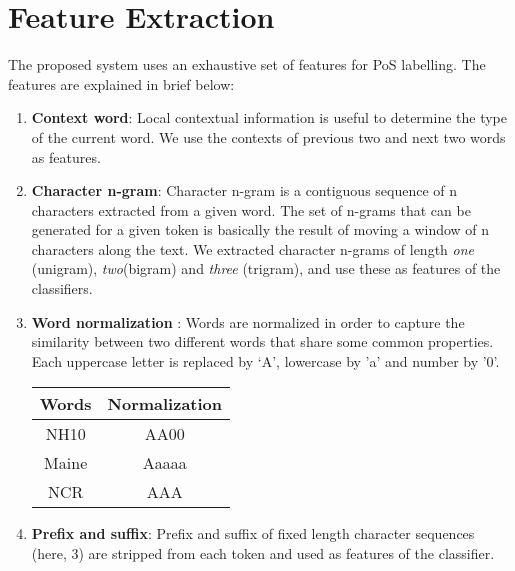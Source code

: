 \documentclass[11pt,a4paper]{article}
\begin{document}
\section{Feature Extraction}\label{feature}
The proposed system uses an exhaustive set of features for PoS labelling. The features are explained in brief below:
\begin{enumerate}
\item \textbf{Context word}: Local contextual information is useful to determine the type of the current word. We use the contexts of previous two and next two words as features. 
\item \textbf{Character n-gram}: 
Character n-gram is a contiguous sequence of n characters extracted from a given word. The set of n-grams that can be generated for a given token is basically the result of moving a window of n characters along the text. We extracted character n-grams of length \textit{one} (unigram), \textit{two}(bigram) and \textit{three} (trigram), and use these as features of the classifiers.
\item \textbf{Word normalization }: Words are normalized in order to capture the similarity between two different words that share some common properties. Each uppercase letter is replaced by \lq A\rq, lowercase by 'a' and number by '0'.
\begin{table}[h]
\centering
\begin{tabular}{|c|c|}
\hline
\textbf{Words} & \textbf{Normalization} \\ \hline
NH10  & AA00          \\ \hline
Maine & Aaaaa         \\ \hline
NCR   & AAA           \\ \hline
\end{tabular}
\end{table}
\item \textbf{Prefix and suffix}: Prefix and suffix of fixed length character sequences (here, 3) are stripped from each token and used as features of the classifier. 


\end{enumerate}
\end{document}
